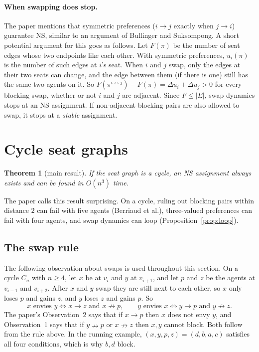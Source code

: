 \documentclass[11pt,a4paper]{article}
\newtheorem{theorem}{Theorem}
\theoremstyle{definition}
\theoremstyle{remark}
\theoremstyle{plain}
\newcommand{\nlikes}{\nrightarrow}
\begin{document}
\paragraph{When swapping does stop.} The paper mentions that symmetric preferences ($i\to j$ exactly when $j\to i$) guarantee NS, similar to an argument of Bullinger and Suksompong. A short potential argument for this goes as follows. Let $F(\pi)$ be the number of seat edges whose two endpoints like each other. With symmetric preferences, $u_i(\pi)$ is the number of such edges at $i$'s seat. When $i$ and $j$ swap, only the edges at their two seats can change, and the edge between them (if there is one) still has the same two agents on it. So $F(\pi^{i\leftrightarrow j})-F(\pi)=\Delta u_i+\Delta u_j>0$ for every blocking swap, whether or not $i$ and $j$ are adjacent. Since $F\le|E|$, swap dynamics stops at an NS assignment. If non-adjacent blocking pairs are also allowed to swap, it stops at a \emph{stable} assignment.

\section{Cycle seat graphs}

\begin{theorem}[main result]\label{thm:cycle}
If the seat graph is a cycle, an NS assignment always exists and can be found in $O(n^3)$ time.
\end{theorem}

The paper calls this result surprising. On a cycle, ruling out blocking pairs within distance $2$ can fail with five agents (Berriaud et al.), three-valued preferences can fail with four agents, and swap dynamics can loop (Proposition~\ref{prop:loop}).

\subsection{The swap rule}

The following observation about swaps is used throughout this section. On a cycle $C_n$ with $n\ge4$, let $x$ be at $v_i$ and $y$ at $v_{i+1}$, and let $p$ and $z$ be the agents at $v_{i-1}$ and $v_{i+2}$. After $x$ and $y$ swap they are still next to each other, so $x$ only loses $p$ and gains $z$, and $y$ loses $z$ and gains $p$. So
\[
x \text{ envies } y \iff x\to z \text{ and } x\nlikes p, \qquad
y \text{ envies } x \iff y\to p \text{ and } y\nlikes z .
\]
The paper's Observation~2 says that if $x\to p$ then $x$ does not envy $y$, and Observation~1 says that if $y\nlikes p$ or $x\nlikes z$ then $x,y$ cannot block. Both follow from the rule above. In the running example, $(x,y,p,z)=(d,b,a,c)$ satisfies all four conditions, which is why $b,d$ block.
\end{document}
